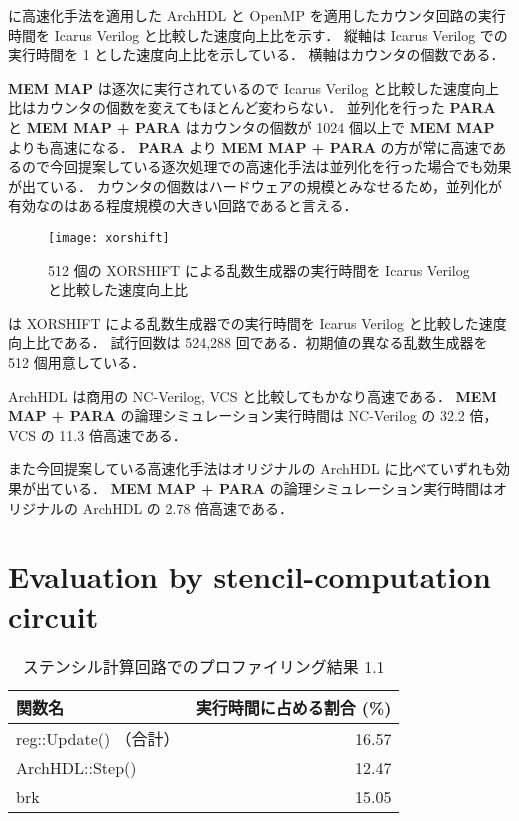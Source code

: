  に高速化手法を適用した ArchHDL と OpenMP を適用したカウンタ回路の実行時間を Icarus Verilog と比較した速度向上比を示す．
縦軸は Icarus Verilog での実行時間を 1 とした速度向上比を示している．
横軸はカウンタの個数である．

\textbf{MEM MAP} は逐次に実行されているので Icarus Verilog と比較した速度向上比はカウンタの個数を変えてもほとんど変わらない．
並列化を行った \textbf{PARA} と \textbf{MEM MAP + PARA} はカウンタの個数が 1024 個以上で \textbf{MEM MAP} よりも高速になる．
\textbf{PARA} より \textbf{MEM MAP + PARA} の方が常に高速であるので今回提案している逐次処理での高速化手法は並列化を行った場合でも効果が出ている．
カウンタの個数はハードウェアの規模とみなせるため，並列化が有効なのはある程度規模の大きい回路であると言える．


\begin{figure}[tb]
 \centering
 \texttt{[image: xorshift]}
 \caption{512 個の XORSHIFT による乱数生成器の実行時間を Icarus Verilog と比較した速度向上比}
 \label{fig:xorshift}
\end{figure}

 は XORSHIFT による乱数生成器での実行時間を Icarus Verilog と比較した速度向上比である．
試行回数は 524,288 回である．初期値の異なる乱数生成器を 512 個用意している．

ArchHDL は商用の NC-Verilog, VCS と比較してもかなり高速である．
\textbf{MEM MAP + PARA} の論理シミュレーション実行時間は NC-Verilog の 32.2 倍，VCS の 11.3 倍高速である．

また今回提案している高速化手法はオリジナルの ArchHDL に比べていずれも効果が出ている．
\textbf{MEM MAP + PARA} の論理シミュレーション実行時間はオリジナルの ArchHDL の 2.78 倍高速である．


\section{Evaluation by stencil-computation circuit}


\begin{table}[tb]
 \caption{ステンシル計算回路でのプロファイリング結果 1.1}
 \label{table:stencil_prof1.1}
 \begin{center}
  \begin{tabular}{lr} \toprule
  関数名 & 実行時間に占める割合 (\%) \\ \midrule
  reg::Update() （合計） & 16.57 \\
  ArchHDL::Step() & 12.47 \\
  brk & 15.05 \\ \bottomrule
  \end{tabular}
 \end{center}
\end{table}

